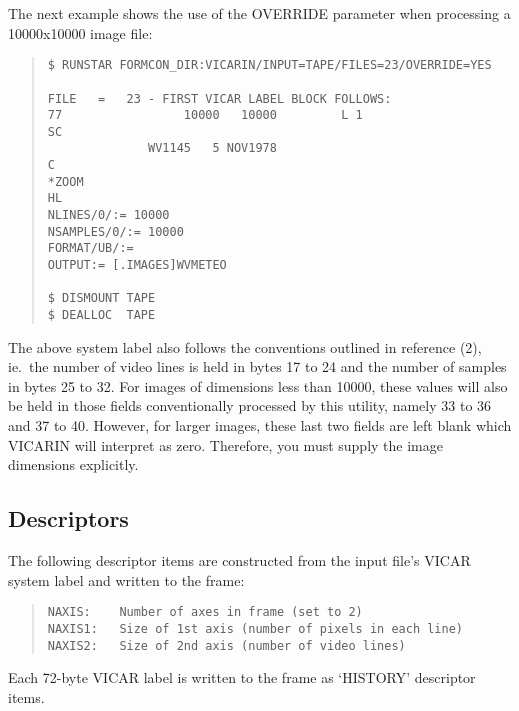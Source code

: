 The next example shows the use of the OVERRIDE parameter when processing a
10000x10000 image file:
\begin{quote}
\begin{verbatim}
$ RUNSTAR FORMCON_DIR:VICARIN/INPUT=TAPE/FILES=23/OVERRIDE=YES

FILE   =   23 - FIRST VICAR LABEL BLOCK FOLLOWS:
77                 10000   10000         L 1                          SC
              WV1145   5 NOV1978                                       C
*ZOOM                                                                 HL
NLINES/0/:= 10000
NSAMPLES/0/:= 10000
FORMAT/UB/:=
OUTPUT:= [.IMAGES]WVMETEO

$ DISMOUNT TAPE
$ DEALLOC  TAPE
\end{verbatim}
\end{quote}
The above system label also follows the conventions outlined in reference (2),
ie.\ the number of video lines is held in bytes 17 to 24 and the number of samples
in bytes 25 to 32.
For images of dimensions less than 10000, these values will also be held in
those fields conventionally processed by this utility, namely 33 to 36 and 37 to
40.
However, for larger images, these last two fields are left blank which VICARIN
will interpret as zero.
Therefore, you must supply the image dimensions explicitly.
\subsection {Descriptors}
The following descriptor items are constructed from the input file's VICAR
system label and written to the frame:
\begin{quote}
\begin{verbatim}
NAXIS:    Number of axes in frame (set to 2)
NAXIS1:   Size of 1st axis (number of pixels in each line)
NAXIS2:   Size of 2nd axis (number of video lines)
\end{verbatim}
\end{quote}
Each 72-byte VICAR label is written to the frame as `HISTORY' descriptor items.
